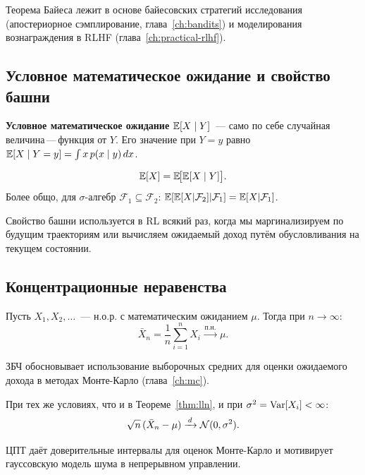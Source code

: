Теорема Байеса лежит в основе байесовских стратегий исследования (апостериорное сэмплирование, глава~\ref{ch:bandits}) и моделирования вознаграждения в RLHF (глава~\ref{ch:practical-rlhf}).

\subsection*{Условное математическое ожидание и свойство башни}

\textbf{Условное математическое ожидание} $\operatorname{\mathbb{E}}[X \mid Y]$~--- само по себе случайная величина\,---\,функция от $Y$. Его значение при $Y=y$ равно $\operatorname{\mathbb{E}}[X \mid Y=y] = \int x\,p(x \mid y)\,dx$.

\begin{theorem}
\label{thm:tower}
\[
    \operatorname{\mathbb{E}}[X] = \operatorname{\mathbb{E}}\!\bigl[\operatorname{\mathbb{E}}[X \mid Y]\bigr].
\]
Более общо, для $\sigma$-алгебр $\mathcal{F}_1 \subseteq \mathcal{F}_2$: $\operatorname{\mathbb{E}}[\operatorname{\mathbb{E}}[X|\mathcal{F}_2]|\mathcal{F}_1] = \operatorname{\mathbb{E}}[X|\mathcal{F}_1]$.
\end{theorem}

Свойство башни используется в RL всякий раз, когда мы маргинализируем по будущим траекториям или вычисляем ожидаемый доход путём обусловливания на текущем состоянии.

\subsection*{Концентрационные неравенства}

\begin{theorem}
\label{thm:lln}
Пусть $X_1, X_2, \ldots$~--- н.о.р. с математическим ожиданием $\mu$. Тогда при $n \to \infty$:
\[
    \bar{X}_n = \frac{1}{n}\sum_{i=1}^n X_i \xrightarrow{\,\mbox{п.н.}\,} \mu.
\]
\end{theorem}

ЗБЧ обосновывает использование выборочных средних для оценки ожидаемого дохода в методах Монте-Карло (глава~\ref{ch:mc}).

\begin{theorem}
\label{thm:clt}
При тех же условиях, что и в Теореме~\ref{thm:lln}, и при $\sigma^2 = \operatorname{Var}[X_i] < \infty$:
\[
    \sqrt{n}\,(\bar{X}_n - \mu) \xrightarrow{\,d\,} \mathcal{N}(0, \sigma^2).
\]
\end{theorem}

ЦПТ даёт доверительные интервалы для оценок Монте-Карло и мотивирует гауссовскую модель шума в непрерывном управлении.

